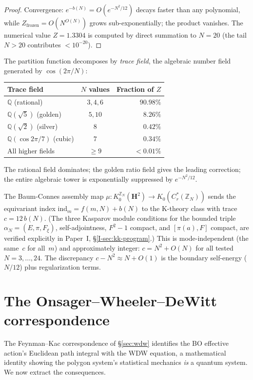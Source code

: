 \begin{proof}
Convergence: $e^{-b(N)} = O(e^{-N^2/12})$ decays faster than any
polynomial, while $Z_{\mathrm{frozen}} = O(N^{O(N)})$ grows
sub-exponentially; the product vanishes.
The numerical value $Z = 1.3304$ is computed by direct summation
to $N = 20$ (the tail $N > 20$ contributes $< 10^{-20}$).
\end{proof}

The partition function decomposes by \emph{trace field}, the
algebraic number field generated by $\cos(2\pi/N)$:
\begin{center}
\small
\begin{tabular}{lcr}
\toprule
Trace field & $N$ values & Fraction of $Z$ \\
\midrule
$\mathbb{Q}$ (rational) & $3, 4, 6$ & $90.98\%$ \\
$\mathbb{Q}(\sqrt{5})$ (golden) & $5, 10$ & $8.26\%$ \\
$\mathbb{Q}(\sqrt{2})$ (silver) & $8$ & $0.42\%$ \\
$\mathbb{Q}(\cos 2\pi/7)$ (cubic) & $7$ & $0.34\%$ \\
All higher fields & $\ge 9$ & $< 0.01\%$ \\
\bottomrule
\end{tabular}
\end{center}
\noindent
The rational field dominates; the golden ratio field gives the
leading correction; the entire algebraic tower is exponentially
suppressed by $e^{-N^2/12}$.

The Baum-Connes assembly map $\mu\colon K_0^{\mathbb{Z}_N}(\mathbf{H}^2)
\to K_0(C^*_r(\mathbb{Z}_N))$ sends the equivariant index
$\mathrm{ind}_m = f(m,N) + b(N)$ to the K-theory class with trace
$c = 12\,b(N)$.
(The three Kasparov module conditions for the bounded triple
$\alpha_N = (E, \pi, F_\xi)$, self-adjointness, $F^2{-}1$ compact,
and $[\pi(a), F]$ compact, are verified explicitly in
Paper~I, \S\ref*{I-sec:kk-program}.)  This is mode-independent (the same~$c$ for
all~$m$) and approximately integer: $c = N^2 + O(N)$ for all tested
$N = 3,\ldots,24$.  The discrepancy $c - N^2 \approx N + O(1)$
is the boundary self-energy ($N/12$) plus regularization terms.

\section{The Onsager--Wheeler--DeWitt correspondence}
\label{sec:qm-gr-bridge}

The Feynman--Kac correspondence of \S\ref{sec:wdw}
identifies the BO effective action's Euclidean path integral
with the WDW equation, a mathematical identity showing
the polygon system's statistical mechanics \emph{is}
a quantum system.
We now extract the consequences.

